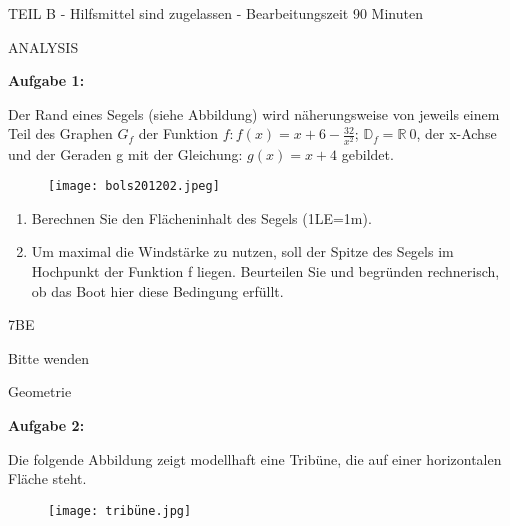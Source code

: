 \documentclass[a4paper,12pt]{article}
\newcommand{\Aufgabe}[1]{
  {
  \vspace*{0.5cm}
  \textsf{\textbf{Aufgabe #1}}
  \vspace*{0.2cm}
  
  }
}
\begin{document}



\vspace{0,5cm} {TEIL B} -  Hilfsmittel sind zugelassen - Bearbeitungszeit 90 Minuten

\vspace {0,2cm}
ANALYSIS

\Aufgabe {1:} 
Der Rand eines Segels (siehe Abbildung) wird näherungsweise von jeweils einem Teil des Graphen $G_f$ der Funktion $f: f(x)=x+6-\frac{32}{x^2}$;
$ \mathbb{D}_f= \mathbb{R}\  {0}$, der x-Achse und der Geraden g mit der Gleichung: $g(x)=x+4$ gebildet.

\begin{figure}[h!]
  \begin{center}
    \texttt{[image: bols201202.jpeg]}
  \end{center}
\end{figure}

\begin{enumerate}[label={\alph*)}]
\item Berechnen Sie den Flächeninhalt des Segels (1LE=1m).
\item Um maximal die Windstärke zu nutzen, soll der Spitze des Segels im Hochpunkt der Funktion f liegen. Beurteilen Sie und begründen rechnerisch, ob das Boot hier diese Bedingung erfüllt. 
\end{enumerate}  
\begin{flushright}7BE \end{flushright}
\begin{flushright}Bitte wenden \end{flushright}
\newpage

\vspace {0,2cm}
Geometrie 
\Aufgabe{2:} 
Die folgende Abbildung zeigt modellhaft eine Tribüne, die auf einer horizontalen Fläche steht.

\begin{figure}[h!]
  \begin{center}
    \texttt{[image: tribüne.jpg]}
  \end{center}
\end{figure}
\end{document}
